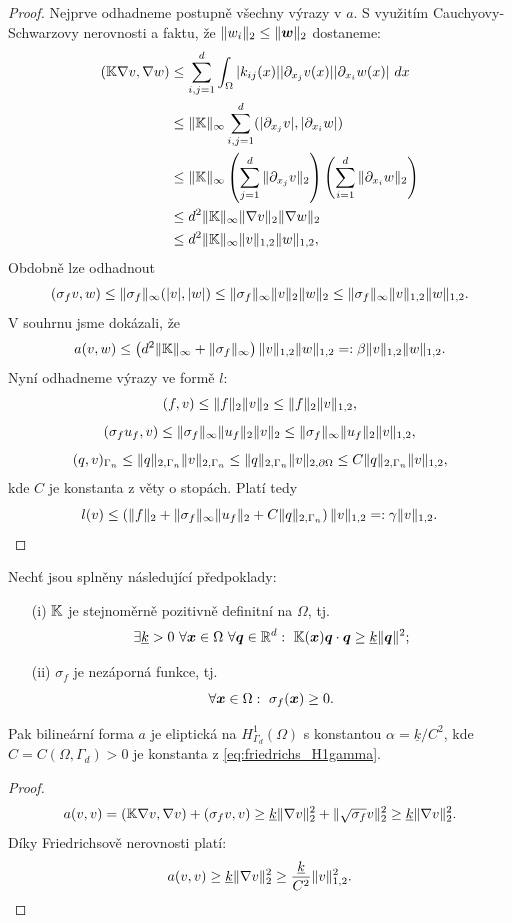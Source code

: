 \begin{proof}
Nejprve odhadneme postupně všechny výrazy v $a$.
S využitím Cauchyovy-Schwarzovy nerovnosti a faktu, že $\|w_i\|_2\le\|\mathbf{\boldsymbol{w}}\|_2$ dostaneme:
\begin{align*}
({\mathbb{K}}\nabla v,\nabla w)
&\le \sum_{i,j=1}^d\int_\Omega|k_{ij}(x)||\partial_{x_j}v(x)||\partial_{x_i}w(x)|~dx\\
&\le \|{\mathbb{K}}\|_\infty\sum_{i,j=1}^d(|\partial_{x_j}v|,|\partial_{x_i}w|)\\
&\le \|{\mathbb{K}}\|_\infty\left(\sum_{j=1}^d\|\partial_{x_j}v\|_2\right)\left(\sum_{i=1}^d\|\partial_{x_i}w\|_2\right)\\
&\le d^2\|{\mathbb{K}}\|_\infty \|\nabla v\|_2 \|\nabla w\|_2\\
&\le d^2\|{\mathbb{K}}\|_\infty\|v\|_{1,2}\|w\|_{1,2},
\end{align*}
Obdobně lze odhadnout
\[ (\sigma_f v,w)
\le \|\sigma_f\|_\infty(|v|,|w|)
\le \|\sigma_f\|_\infty\|v\|_2\|w\|_2
\le \|\sigma_f\|_\infty\|v\|_{1,2}\|w\|_{1,2}. \]
V souhrnu jsme dokázali, že
\[ a(v,w) \le \left(d^2\|{\mathbb{K}}\|_\infty+\|\sigma_f\|_\infty\right)\|v\|_{1,2}\|w\|_{1,2} =: \beta \|v\|_{1,2}\|w\|_{1,2}. \]
Nyní odhadneme výrazy ve formě $l$:
\[ (f,v) \le \|f\|_2\|v\|_2 \le \|f\|_2\|v\|_{1,2}, \]
\[ (\sigma_f u_f,v) \le \|\sigma_f\|_\infty\|u_f\|_2\|v\|_2 \le \|\sigma_f\|_\infty\|u_f\|_2\|v\|_{1,2}, \]
\[ (q,v)_{\Gamma_n} \le \|q\|_{2,\Gamma_n}\|v\|_{2,\Gamma_n}
\le \|q\|_{2,\Gamma_n}\|v\|_{2,\partial\Omega}
\le C\|q\|_{2,\Gamma_n}\|v\|_{1,2}, \]
kde $C$ je konstanta z věty o stopách.
Platí tedy
\[ l(v) \le \left(\|f\|_2+\|\sigma_f\|_\infty\|u_f\|_2+C\|q\|_{2,\Gamma_n}\right)\|v\|_{1,2} =:\gamma\|v\|_{1,2}. \]
\end{proof}


\begin{veta}
Nechť jsou splněny následující předpoklady:
\begin{itemize}
\item[(i)] ${\mathbb{K}}$ je stejnoměrně pozitivně definitní na $\Omega$, tj.
\[ \exists \underline k>0~\forall \mathbf{\boldsymbol{x}}\in\Omega~\forall\mathbf{\boldsymbol{q}}\in\mathbb R^d:~{\mathbb{K}}(\mathbf{\boldsymbol{x}})\mathbf{\boldsymbol{q}}\cdot\mathbf{\boldsymbol{q}}\ge\underline k\|\mathbf{\boldsymbol{q}}\|^2; \]
\item[(ii)] $\sigma_f$ je nezáporná funkce, tj.
\[ \forall\mathbf{\boldsymbol{x}}\in\Omega:~\sigma_f(\mathbf{\boldsymbol{x}})\ge 0. \]
\end{itemize}
Pak bilineární forma $a$ je eliptická na $H^1_{\Gamma_d}(\Omega)$ s konstantou $\alpha=\underline k/{C^2}$, kde $C=C(\Omega,\Gamma_d)>0$ je konstanta z \eqref{eq:friedrichs_H1gamma}.
\end{veta}
\begin{proof}
\[ a(v,v) = ({\mathbb{K}}\nabla v,\nabla v) + (\sigma_f v,v)
\ge \underline k\|\nabla v\|_2^2 + \|\sqrt{\sigma_f}v\|_2^2 \ge \underline k\|\nabla v\|_2^2. \] 
Díky Friedrichsově nerovnosti platí:
\[ a(v,v) \ge \underline k\|\nabla v\|_2^2 \ge \frac{\underline k}{C^2}\|v\|_{1,2}^2. \]
\end{proof}



